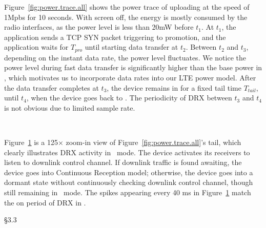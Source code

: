 Figure~\ref{fig:power.trace.all} shows the power trace of uploading at the speed of 1Mpbs for 10 seconds. With screen off, the energy is mostly consumed by the radio interfaces, as the power level is less than 20mW before $t_1$. At $t_1$, the application sends a TCP {\sf SYN} packet triggering \RI to \RC promotion, and the application waits for $T_{pro}$ until starting data transfer at $t_2$. Between $t_2$ and $t_3$, depending on the instant data rate, the power level fluctuates. We notice the power level during fast data transfer is significantly higher than the base power in \RC, which motivates us to incorporate data rates into our LTE power model. After the data transfer completes at $t_3$, the device remains in \RC for a fixed tail time $T_{tail}$, until $t_4$, when the device goes back to \RI. The periodicity of DRX between $t_3$ and $t_4$ is not obvious due to limited sample rate.


\begin{figure}[h]
\centering
{} \\
\label{fig:power.trace.zoom}
\end{figure}

Figure~\ref{fig:power.trace.zoom} is a 125$\times$ zoom-in view of Figure~\ref{fig:power.trace.all}'s tail, which clearly illustrates DRX activity in \RC~mode. The device activates its receivers to listen to downlink control channel. If downlink traffic is found awaiting, the device goes into Continuous Reception model; otherwise, the device goes into a dormant state without continuously checking downlink control channel, though still remaining in \RC~mode. The spikes appearing every 40 ms in Figure~\ref{fig:power.trace.zoom} match the on period of DRX in \RC.






\S3.3

